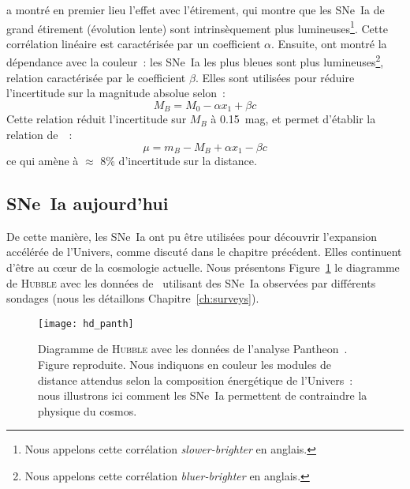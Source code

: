\documentclass[../main/main.tex]{subfiles}
\begin{document}
\cite{phillips1993} a montré en premier lieu l'effet avec l'étirement, qui
montre que les SNe~Ia de grand étirement (évolution lente) sont intrinsèquement
plus lumineuses\footnote{Nous appelons cette corrélation
\textit{slower-brighter} en anglais.}. Cette corrélation linéaire est
caractérisée par un coefficient $\alpha$. Ensuite, \cite{hamuy1996} ont montré
la dépendance avec la couleur~: les SNe~Ia les plus bleues sont plus
lumineuses\footnote{Nous appelons cette corrélation \textit{bluer-brighter} en
anglais.}, relation caractérisée par le coefficient $\beta$. Elles sont utilisées
pour réduire l'incertitude sur la magnitude absolue selon~:
\begin{equation}\label{eq:mxc}
    M_B = M_0 - \alpha x_1 + \beta c
\end{equation}
Cette relation réduit l'incertitude sur $M_B$ à \SI{0.15}{mag}, et permet
d'établir la relation de~\cite{tripp1998}~:
\begin{equation}
    \mu = m_B - M_B + \alpha x_1 - \beta c
\end{equation}
ce qui amène à $\approx$ 8\% d'incertitude sur la distance.

\subsection{SNe~Ia aujourd'hui}\label{ssec:snetoday}

De cette manière, les SNe~Ia ont pu être utilisées pour découvrir l'expansion
accélérée de l'Univers, comme discuté dans le chapitre précédent. Elles
continuent d'être au cœur de la cosmologie actuelle. Nous présentons
Figure~\ref{fig:hubdiag} le diagramme de \textsc{Hubble} avec les données
de~\cite{scolnic2018} utilisant des SNe~Ia observées par différents sondages
(nous les détaillons Chapitre~\ref{ch:surveys}).

\begin{figure}[]
    \centering
    \texttt{[image: hd\_panth]}
    \caption[Diagramme de \textsc{Hubble} avec les données de l'analyse
    Pantheon]{Diagramme de \textsc{Hubble} avec les données de l'analyse
        Pantheon~\citep{scolnic2018}. Figure reproduite. Nous indiquons en
        couleur les modules de distance attendus selon la composition
        énergétique de l'Univers~: nous illustrons ici comment les SNe~Ia
    permettent de contraindre la physique du cosmos.}\label{fig:hubdiag}
\end{figure}
\end{document}
